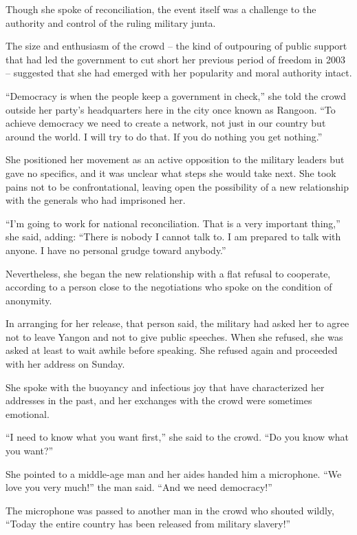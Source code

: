 ﻿\documentclass[12pt]{article}
\begin{document}
Though she spoke of reconciliation, the event itself was a challenge to the authority and control of
the ruling military junta.

The size and enthusiasm of the crowd -- the kind of outpouring of public support that had led the
government to cut short her previous period of freedom in 2003 -- suggested that she had emerged
with her popularity and moral authority intact.

``Democracy is when the people keep a government in check,'' she told the crowd outside her party's
headquarters here in the city once known as Rangoon. ``To achieve democracy we need to create a
network, not just in our country but around the world. I will try to do that. If you do nothing you
get nothing.''

She positioned her movement as an active opposition to the military leaders but gave no specifics,
and it was unclear what steps she would take next. She took pains not to be confrontational, leaving
open the possibility of a new relationship with the generals who had imprisoned her.

``I'm going to work for national reconciliation. That is a very important thing,'' she said, adding:
``There is nobody I cannot talk to. I am prepared to talk with anyone. I have no personal grudge
toward anybody.''

Nevertheless, she began the new relationship with a flat refusal to cooperate, according to a person
close to the negotiations who spoke on the condition of anonymity.

In arranging for her release, that person said, the military had asked her to agree not to leave
Yangon and not to give public speeches. When she refused, she was asked at least to wait awhile
before speaking. She refused again and proceeded with her address on Sunday.

She spoke with the buoyancy and infectious joy that have characterized her addresses in the past,
and her exchanges with the crowd were sometimes emotional.

``I need to know what you want first,'' she said to the crowd. ``Do you know what you want?''

She pointed to a middle-age man and her aides handed him a microphone. ``We love you very much!''
the man said. ``And we need democracy!''

The microphone was passed to another man in the crowd who shouted wildly, ``Today the entire country
has been released from military slavery!''
\end{document}
